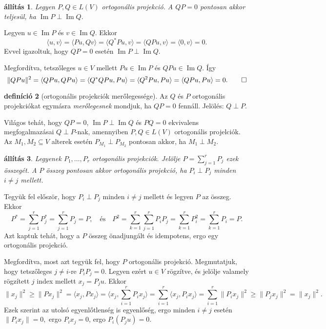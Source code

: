 \documentclass[a4paper, showtrims]{memoir}
\makeatletter
\renewenvironment{proof}[1][\proofname]
    {\par\pushQED{\qed}%
    \normalfont \topsep6\p@\@plus6\p@\relax
    \trivlist
    \item[\hskip\labelsep
        \itshape
    #1\@addpunct{:}]\ignorespaces}
    {\popQED\endtrivlist\@endpefalse}
\theoremstyle{plain}
\newtheorem{proposition}{állítás}[chapter]
\theoremstyle{remark}
\theoremstyle{definition}
\newtheorem{definition}[proposition]{definíció}
\DeclareMathOperator{\im}{Im}
\newcommand{\ip}[2]{\langle#1,#2\rangle}
\makeatother
\begin{document}
\begin{proposition}
	Legyen $P,Q\in L\left( V \right)$ ortogonális projekció.
	A $QP=0$ pontosan akkor teljesül, ha $\im P\perp\im Q$.
\end{proposition}
\begin{proof}
	Legyen $u\in \im P$ és $v\in \im Q$.
	Ekkor
	\[
		\ip{u}{v}
		=
		\ip{Pu}{Qv}
		=
		\ip{Q^\ast Pu}{v}
		=
		\ip{QPu}{v}
		=
		\ip{0}{v}
		=
		0.
	\]
	Evvel igazoltuk, hogy $QP=0$ esetén $\im P\perp\im Q$.

	Megfordítva, tetszőleges $u\in V$ mellett $Pu\in\im P$ és $QPu\in\im Q$.
	Így
	\[
		\|QPu\|^2
		=
		\ip{QPu}{QPu}
		=
		\ip{Q^\ast QPu}{Pu}
		=
		\ip{Q^2Pu}{Pu}
		=
		\ip{QPu}{Pu}
		=
		0.
		\qedhere
	\]
\end{proof}
\begin{definition}[ortogonális projekciók merőlegessége]
	Az $Q$ és $P$ ortogonális projekciókat egymásra \emph{merőlegesnek} mondjuk, ha $QP=0$ fennáll.
	Jelölés: $Q\perp P$.
\end{definition}
Világos tehát, hogy $QP=0$, $\im P\perp \im Q$ és $PQ=0$ ekvivalens megfogalmazásai $Q\perp P$-nak,
amennyiben $P,Q\in L\left( V \right)$ ortogonális projelciók.
Az $M_1, M_2\subseteq V$ alterek esetén $P_{M_1}\perp P_{M_2}$ pontosan akkor, ha $M_1\perp M_2$.
\begin{proposition}
	Legyenek $P_1,\ldots,P_r$ ortogonális projekciók.
	Jelölje $P=\sum_{j=1}^rP_j$ ezek összegét.
	A $P$ összeg pontosan akkor ortogonális projekció, ha $P_i\perp P_j$ minden $i\neq j$ mellett.
\end{proposition}
\begin{proof}
    Tegyük fel először, hogy $P_i\perp P_j$ minden $i\neq j$ mellett és legyen $P$ az összeg.
    Ekkor
    \[
        P^\ast
        =
        \sum_{j=1}^rP_j^\ast
        =
        \sum_{j=1}^rP_j
        =
        P,
        \quad\text{és}\quad
        P^2
        =
        \sum_{k=1}^r\sum_{j=1}^rP_iP_j
        =
        \sum_{k=1}^rP_i^2
        =
        \sum_{k=1}^rP_i
        =
        P.
    \]
    Azt kaptuk tehát, hogy a $P$ összeg önadjungált és idempotens,
    ergo egy ortogonális projekció.

    Megfordítva, most azt tegyük fel, hogy $P$ ortogonális projekció.
    Megmutatjuk, hogy tetszőleges $j\neq i$-re
    $P_iP_j=0$.
    Legyen ezért $u\in V$ rögzítve, és jelölje valamely rögzített $j$ index mellett $x_j=P_ju$.
    Ekkor
    \[
        \|x_j\|^2
        \geq
        \|Px_j\|^2
        =
        \ip{x_j}{Px_j}
        =
        \ip{x_j}{\sum_{i=1}^rP_ix_j}
        =
        \sum_{i=1}^r\ip{x_j}{P_ix_j}
        =
        \sum_{i=1}^r\|P_ix_j\|^2
        \geq
        \|P_jx_j\|^2
        =
        \|x_j\|^2.
    \]
    Ezek szerint az utolsó egyenlőtlenség is egyenlőség, 
    ergo minden $i\neq j$ esetén
    \(
    \|P_ix_j\|=0,
    \)
    ergo
    \(P_ix_j=0\),
    ergo
    $P_i\left( P_ju \right)=0.$
\end{proof}
\end{document}
